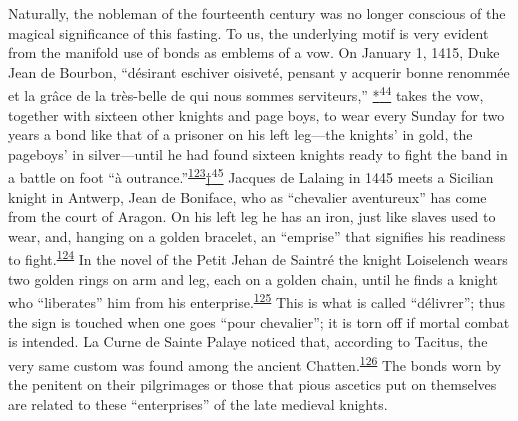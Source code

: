 Naturally, the nobleman of the fourteenth century was no longer
conscious of the magical significance of this fasting. To us, the
\protect\hypertarget{10_Chapter_Three__THE_HEROIC_DREAM.xhtmlux5cux23page_101}{}{}underlying
motif is very evident from the manifold use of bonds as emblems of a
vow. On January 1, 1415, Duke Jean de Bourbon, ``désirant eschiver
oisiveté, pensant y acquerir bonne renommée et la grâce de la très-belle
de qui nous sommes serviteurs,''
\protect\hypertarget{10_Chapter_Three__THE_HEROIC_DREAM.xhtmlux5cux23id_2875}{\protect\hyperlink{23_NOTES.xhtmlux5cux23id_2876}{*\textsuperscript{44}}}
takes the vow, together with sixteen other knights and page boys, to
wear every Sunday for two years a bond like that of a prisoner on his
left leg---the knights' in gold, the pageboys' in silver---until he had
found sixteen knights ready to fight the band in a battle on foot ``à
outrance.''\textsuperscript{\protect\hypertarget{10_Chapter_Three__THE_HEROIC_DREAM.xhtmlux5cux23id_1689}{\protect\hyperlink{23_NOTES.xhtmlux5cux23id_1690}{123}}}\protect\hypertarget{10_Chapter_Three__THE_HEROIC_DREAM.xhtmlux5cux23id_2877}{\protect\hyperlink{23_NOTES.xhtmlux5cux23id_2878}{†\textsuperscript{45}}}
Jacques de Lalaing in 1445 meets a Sicilian knight in Antwerp, Jean de
Boniface, who as ``chevalier aventureux'' has come from the court of
Aragon. On his left leg he has an iron, just like slaves used to wear,
and, hanging on a golden bracelet, an ``emprise'' that signifies his
readiness to
fight.\textsuperscript{\protect\hypertarget{10_Chapter_Three__THE_HEROIC_DREAM.xhtmlux5cux23id_1687}{\protect\hyperlink{23_NOTES.xhtmlux5cux23id_1688}{124}}}
In the novel of the Petit Jehan de Saintré the knight Loiselench wears
two golden rings on arm and leg, each on a golden chain, until he finds
a knight who ``liberates'' him from his
enterprise.\textsuperscript{\protect\hypertarget{10_Chapter_Three__THE_HEROIC_DREAM.xhtmlux5cux23id_1685}{\protect\hyperlink{23_NOTES.xhtmlux5cux23id_1686}{125}}}
This is what is called ``délivrer''; thus the sign is touched when one
goes ``pour chevalier''; it is torn off if mortal combat is intended. La
Curne de Sainte Palaye noticed that, according to Tacitus, the very same
custom was found among the ancient
Chatten.\textsuperscript{\protect\hypertarget{10_Chapter_Three__THE_HEROIC_DREAM.xhtmlux5cux23id_1683}{\protect\hyperlink{23_NOTES.xhtmlux5cux23id_1684}{126}}}
The bonds worn by the penitent on their pilgrimages or those that pious
ascetics put on themselves are related to these ``enterprises'' of the
late medieval knights.

